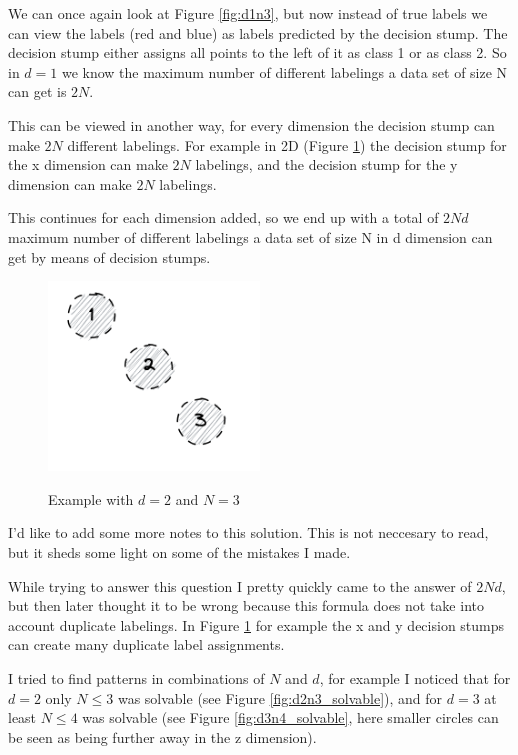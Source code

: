 \documentclass[11pt,a4paper]{article}
\begin{document}
We can once again look at Figure \ref{fig:d1n3}, but now instead of true labels we can view the labels (red and blue) as labels predicted by the decision stump. The decision stump either assigns all points to the left of it as class 1 or as class 2. So in $d=1$ we know the maximum number of different labelings a data set of size N can get is $2N$. 

This can be viewed in another way, for every dimension the decision stump can make $2N$ different labelings. For example in 2D (Figure \ref{fig:d2n3}) the decision stump for the x dimension can make $2N$ labelings, and the decision stump for the y dimension can make $2N$ labelings.

This continues for each dimension added, so we end up with a total of $2Nd$ maximum number of different labelings a data set of size N in d dimension can get by means of decision stumps.


\begin{figure}[h]
    \caption{Example with $d=2$ and $N=3$}
    \centering
    \includegraphics[width=0.5\textwidth]{d2n3_unlabeled.png}
    \label{fig:d2n3}
\end{figure}

I'd like to add some more notes to this solution. This is not neccesary to read, but it sheds some light on some of the mistakes I made. 

While trying to answer this question I pretty quickly came to the answer of $2Nd$, but then later thought it to be wrong because this formula does not take into account duplicate labelings. In Figure \ref{fig:d2n3} for example the x and y decision stumps can create many duplicate label assignments. 

I tried to find patterns in combinations of $N$ and $d$, for example I noticed that for $d=2$ only $N \leq 3$ was solvable (see Figure \ref{fig:d2n3_solvable}), and for $d=3$ at least $N \leq 4$ was solvable (see Figure \ref{fig:d3n4_solvable}, here smaller circles can be seen as being further away in the z dimension). 
\end{document}
